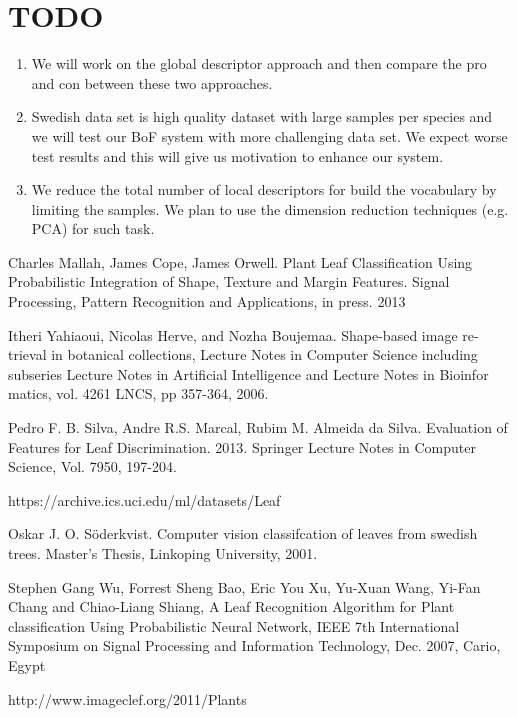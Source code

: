 \documentclass{article}
\begin{document}
\section{TODO}
\begin{enumerate}
  \item We will work on the global descriptor approach and then compare the pro and con between these two approaches.
  \item Swedish data set is high quality dataset with large samples per species and we will test our BoF system with more challenging data set. We expect worse test results and this will give us motivation to enhance our system.
  \item We reduce the total number of local descriptors for build the vocabulary by limiting the samples. We plan to use the dimension reduction techniques (e.g. PCA) for such task.
\end{enumerate}

\begin{thebibliography}{9}
Charles Mallah, James Cope, James Orwell. Plant Leaf Classification Using Probabilistic Integration of Shape, Texture and Margin Features. Signal Processing, Pattern Recognition and Applications, in press. 2013

Itheri Yahiaoui, Nicolas Herve, and Nozha Boujemaa. Shape-based image re-trieval in botanical collections, Lecture Notes in Computer Science including subseries Lecture Notes in Artificial Intelligence and Lecture Notes in Bioinfor matics, vol. 4261 LNCS, pp 357-364, 2006.

Pedro F. B. Silva, Andre R.S. Marcal, Rubim M. Almeida da Silva. Evaluation of Features for Leaf Discrimination. 2013. Springer Lecture Notes in Computer Science, Vol. 7950, 197-204.

https://archive.ics.uci.edu/ml/datasets/Leaf

Oskar J. O. Söderkvist. Computer vision classifcation of leaves from swedish trees. Master's Thesis, Linkoping University, 2001.

Stephen Gang Wu, Forrest Sheng Bao, Eric You Xu, Yu-Xuan Wang, Yi-Fan Chang and Chiao-Liang Shiang, A Leaf Recognition Algorithm for Plant classification Using Probabilistic Neural Network, IEEE 7th International Symposium on Signal Processing and Information Technology, Dec. 2007, Cario, Egypt

http://www.imageclef.org/2011/Plants

\end{thebibliography}
\end{document}
